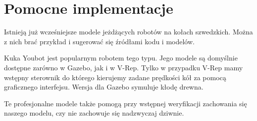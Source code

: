 \section{Pomocne implementacje}
Istnieją już wcześniejsze modele jeżdżących robotów na kołach szwedzkich.
Można z nich brać przykład i sugerować się źródłami kodu i modelów.

Kuka Youbot jest popularnym robotem tego typu. Jego modele są domyślnie dostępne zarówno w Gazebo, jak i w V-Rep.
Tylko w przypadku V-Rep mamy wstępny sterownik do którego kierujemy zadane prędkości kół za pomocą graficznego interfejsu.
Wersja dla Gazebo symuluje kłodę drewna.

Te profesjonalne modele także pomogą przy wstępnej weryfikacji zachowania się naszego modelu, czy nie zachowuje się nadzwyczaj dziwnie.
